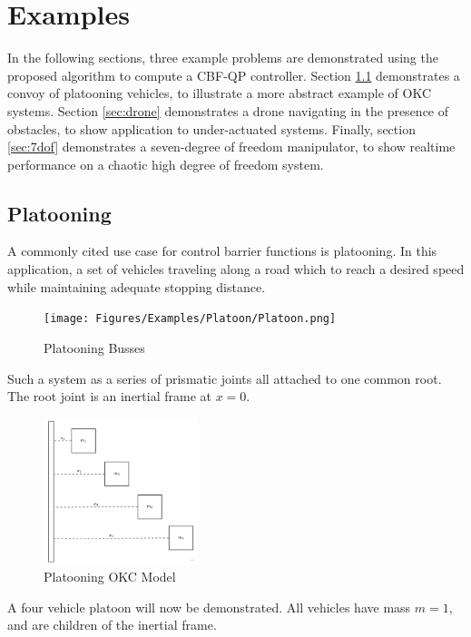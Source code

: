 \chapter{Examples}

In the following sections, three example problems are demonstrated using the proposed algorithm to compute a CBF-QP controller. Section \ref{sec:platooning} demonstrates a convoy of platooning vehicles, to illustrate a more abstract example of OKC systems. Section \ref{sec:drone} demonstrates a drone navigating in the presence of obstacles, to show application to under-actuated systems. Finally, section \ref{sec:7dof} demonstrates a seven-degree of freedom manipulator, to show realtime performance on a chaotic high degree of freedom system.



\section{Platooning} \label{sec:platooning}
\noindent A commonly cited use case for control barrier functions is platooning. In this application, a set of vehicles traveling along a road which to reach a desired speed while maintaining adequate stopping distance. 
\begin{figure}[H]
    \centering
    \texttt{[image: Figures/Examples/Platoon/Platoon.png]}
    \caption{Platooning Busses}
    \label{fig:platoon_diag}
\end{figure}
\noindent Such a system as a series of prismatic joints all attached to one common root. The root joint is an inertial frame at $x=0$.  

\begin{figure}[H]
    \centering
    \includegraphics[width=0.4\textwidth]{Figures/Examples/Platoon/PlatoonNE.png}
    \caption{Platooning OKC Model}
    \label{fig:platoon_diag_2}
\end{figure}
\noindent A four vehicle platoon will now be demonstrated. All vehicles have mass $m = 1$, and are children of the inertial frame. 
